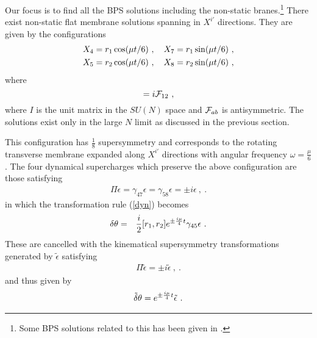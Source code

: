 \documentclass[a4paper,12pt]{article}
\begin{document}
Our focus is to find all the BPS solutions including the
non-static branes.\footnote{Some BPS solutions related to this has
been given in \cite{bak033}.} There exist non-static flat membrane
solutions spanning in $X^{ i'}$ directions.  They are given by the
configurations
\begin{eqnarray}
X_{4}=r_1 \cos(\mu t/6)~, \ \ \ X_{7}=r_1 \sin(\mu t/6)~,\cr
X_{5}=r_2 \cos(\mu t/6)~,\ \ \ X_{8}=r_2 \sin(\mu t/6)~,
\label{conf1-1}
\end{eqnarray}
where
\begin{equation}
[r_1, r_2]= i {\cal F}_{12}~,\label{conf1-2}
\end{equation}
where $I$ is the unit matrix in the $SU(N)$ space and ${\cal
F}_{ab}$ is antisymmetric. The solutions exist only in the large
$N$ limit as discussed in the previous section.

This configuration has $\frac{1}{8}$ supersymmetry and corresponds
to the rotating transverse  membrane expanded along $X^{i'}$
directions with angular frequency $\omega=\frac{\mu}{6}$. The four
dynamical supercharges which preserve the above configuration are
those satisfying
\begin{eqnarray}
\Pi \epsilon=  \gamma_{47}\epsilon =  \gamma_{58}\epsilon = \pm
i\epsilon~,~.
\end{eqnarray}
in which the transformation rule (\ref{dyn}) becomes
\begin{eqnarray}
\delta\theta &=& \frac{i}{2} [ r_1, r_2]
 e^{\pm{i\mu \over 4} t}\gamma_{45}\epsilon~.
  \label{dyn-c}
\end{eqnarray}
These are cancelled with the kinematical supersymmetry
transformations generated by ${\tilde \epsilon}$ satisfying
\begin{eqnarray}
\Pi {\tilde \epsilon}=  \pm i{\tilde \epsilon}~,~.
\end{eqnarray}
and thus given by
\begin{eqnarray}
{\tilde \delta}\theta =
 e^{\pm{i\mu \over 4} t}{\tilde \epsilon}~.
  \label{kin-c}
\end{eqnarray}
\end{document}
